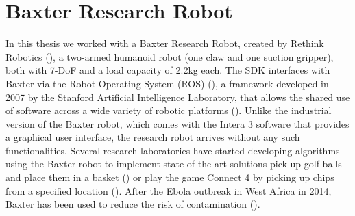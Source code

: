


\section{Baxter Research Robot}\label{sec:baxter}
In this thesis we worked with a Baxter Research Robot, created by Rethink Robotics (\cite{robotics2013baxter}),
a two-armed humanoid robot (one claw and one suction gripper), both with 7-DoF and a load capacity of 2.2kg each.
The SDK interfaces with Baxter via the Robot Operating System (ROS) (\cite{quigley2009ros}), a framework developed in 2007 by the Stanford Artificial Intelligence Laboratory, that allows the shared use of software across a wide variety of robotic platforms (\cite{fernandez2015learning}).
Unlike the industrial version of the Baxter robot, which comes with the Intera 3 software that provides a graphical user interface, the research robot arrives without any such functionalities.
Several research laboratories have started developing algorithms using the Baxter robot to implement state-of-the-art solutions \eg
pick up golf balls and place them in a basket (\cite{BaxterGolf}) or play the game Connect 4 by picking up chips from a specified location (\cite{Connect4}).
After the Ebola outbreak in West Africa in 2014, Baxter has been used to reduce the risk of contamination (\cite{Ebola}).

